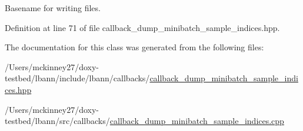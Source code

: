 Basename for writing files. 

Definition at line 71 of file callback\+\_\+dump\+\_\+minibatch\+\_\+sample\+\_\+indices.\+hpp.



The documentation for this class was generated from the following files\+:\begin{DoxyCompactItemize}
\item 
/\+Users/mckinney27/doxy-\/testbed/lbann/include/lbann/callbacks/\hyperlink{callback__dump__minibatch__sample__indices_8hpp}{callback\+\_\+dump\+\_\+minibatch\+\_\+sample\+\_\+indices.\+hpp}\item 
/\+Users/mckinney27/doxy-\/testbed/lbann/src/callbacks/\hyperlink{callback__dump__minibatch__sample__indices_8cpp}{callback\+\_\+dump\+\_\+minibatch\+\_\+sample\+\_\+indices.\+cpp}\end{DoxyCompactItemize}
